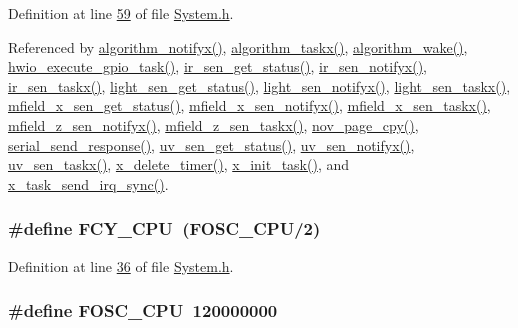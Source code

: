Definition at line \hyperlink{a00072_source_l00059}{59} of file \hyperlink{a00072_source}{System.\+h}.



Referenced by \hyperlink{a00038_source_l02006}{algorithm\+\_\+notifyx()}, \hyperlink{a00038_source_l01905}{algorithm\+\_\+taskx()}, \hyperlink{a00038_source_l00670}{algorithm\+\_\+wake()}, \hyperlink{a00056_source_l00272}{hwio\+\_\+execute\+\_\+gpio\+\_\+task()}, \hyperlink{a00045_source_l00302}{ir\+\_\+sen\+\_\+get\+\_\+status()}, \hyperlink{a00045_source_l00141}{ir\+\_\+sen\+\_\+notifyx()}, \hyperlink{a00045_source_l00069}{ir\+\_\+sen\+\_\+taskx()}, \hyperlink{a00047_source_l00204}{light\+\_\+sen\+\_\+get\+\_\+status()}, \hyperlink{a00047_source_l00106}{light\+\_\+sen\+\_\+notifyx()}, \hyperlink{a00047_source_l00065}{light\+\_\+sen\+\_\+taskx()}, \hyperlink{a00050_source_l00276}{mfield\+\_\+x\+\_\+sen\+\_\+get\+\_\+status()}, \hyperlink{a00050_source_l00107}{mfield\+\_\+x\+\_\+sen\+\_\+notifyx()}, \hyperlink{a00050_source_l00071}{mfield\+\_\+x\+\_\+sen\+\_\+taskx()}, \hyperlink{a00053_source_l00114}{mfield\+\_\+z\+\_\+sen\+\_\+notifyx()}, \hyperlink{a00053_source_l00073}{mfield\+\_\+z\+\_\+sen\+\_\+taskx()}, \hyperlink{a00060_source_l00663}{nov\+\_\+page\+\_\+cpy()}, \hyperlink{a00030_source_l00412}{serial\+\_\+send\+\_\+response()}, \hyperlink{a00073_source_l00302}{uv\+\_\+sen\+\_\+get\+\_\+status()}, \hyperlink{a00073_source_l00141}{uv\+\_\+sen\+\_\+notifyx()}, \hyperlink{a00073_source_l00069}{uv\+\_\+sen\+\_\+taskx()}, \hyperlink{a00037_source_l00482}{x\+\_\+delete\+\_\+timer()}, \hyperlink{a00037_source_l00173}{x\+\_\+init\+\_\+task()}, and \hyperlink{a00037_source_l00521}{x\+\_\+task\+\_\+send\+\_\+irq\+\_\+sync()}.

\hypertarget{a00072_a573f918b7668f8f2b59ac8adeae633a4}{
\subsubsection[{F\+C\+Y\+\_\+\+C\+P\+U}]{\setlength{\rightskip}{0pt plus 5cm}\#define F\+C\+Y\+\_\+\+C\+P\+U~({\bf F\+O\+S\+C\+\_\+\+C\+P\+U}/2)}}\label{a00072_a573f918b7668f8f2b59ac8adeae633a4}


Definition at line \hyperlink{a00072_source_l00036}{36} of file \hyperlink{a00072_source}{System.\+h}.

\hypertarget{a00072_a64b7f2fd4683ad3dcd74ccab1eba40d7}{
\subsubsection[{F\+O\+S\+C\+\_\+\+C\+P\+U}]{\setlength{\rightskip}{0pt plus 5cm}\#define F\+O\+S\+C\+\_\+\+C\+P\+U~120000000}}\label{a00072_a64b7f2fd4683ad3dcd74ccab1eba40d7}



